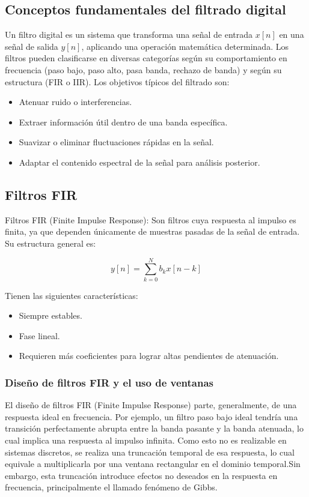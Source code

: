 \documentclass[12pt]{article}
\begin{document}
	\subsection{Conceptos fundamentales del filtrado digital}
	
	Un filtro digital es un sistema que transforma una señal de entrada $x[n]$ en una señal de salida $y[n]$, aplicando una operación matemática determinada. Los filtros pueden clasificarse en diversas categorías según su comportamiento en frecuencia (paso bajo, paso alto, pasa banda, rechazo de banda) y según su estructura (FIR o IIR). Los objetivos típicos del filtrado son:
	
	\begin{itemize}
		\item Atenuar ruido o interferencias.
		\item Extraer información útil dentro de una banda específica.
		\item Suavizar o eliminar fluctuaciones rápidas en la señal.
		\item Adaptar el contenido espectral de la señal para análisis posterior.
	\end{itemize}
	
	\subsection{Filtros FIR}
	
	Filtros FIR (Finite Impulse Response): Son filtros cuya respuesta al impulso es finita, ya que dependen únicamente de muestras pasadas de la señal de entrada. Su estructura general es:
	
	\begin{equation}
		y[n] = \sum_{k=0}^{N} b_k x[n-k]
	\end{equation}\newpage
	
	Tienen las siguientes características:
	\begin{itemize}
		\item Siempre estables.
		\item Fase lineal.
		\item Requieren más coeficientes para lograr altas pendientes de atenuación.
	\end{itemize}
	
	\subsubsection{Diseño de filtros FIR y el uso de ventanas}
	El diseño de filtros FIR (Finite Impulse Response) parte, generalmente, de una respuesta ideal en frecuencia. Por ejemplo, un filtro paso bajo ideal tendría una transición perfectamente abrupta entre la banda pasante y la banda atenuada, lo cual implica una respuesta al impulso infinita. Como esto no es realizable en sistemas discretos, se realiza una truncación temporal de esa respuesta, lo cual equivale a multiplicarla por una ventana rectangular en el dominio temporal.Sin embargo, esta truncación introduce efectos no deseados en la respuesta en frecuencia, principalmente el llamado fenómeno de Gibbs. \\ 
	
\end{document}
